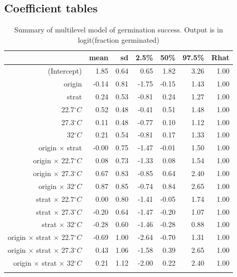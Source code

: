 \documentclass[12pt]{article}\usepackage[]{graphicx}\usepackage[]{color}
\begin{document}
\subsection{Coefficient tables}


\begin{longtable}{rrrrrrr}
\caption{Summary of multilevel model of germination success. Output is in logit(fraction germinated)} \\ 
  & mean & sd & 2.5\% & 50\% & 97.5\% & Rhat \\ 
  \hline
(Intercept) & 1.85 & 0.64 & 0.65 & 1.82 & 3.26 & 1.00 \\ 
  origin & -0.14 & 0.81 & -1.75 & -0.15 & 1.43 & 1.00 \\ 
  strat & 0.24 & 0.53 & -0.81 & 0.24 & 1.27 & 1.00 \\ 
  22.7$^\circ C$ & 0.52 & 0.48 & -0.41 & 0.51 & 1.48 & 1.00 \\ 
  27.3$^\circ C$ & 0.11 & 0.48 & -0.77 & 0.10 & 1.12 & 1.00 \\ 
  32$^\circ C$ & 0.21 & 0.54 & -0.81 & 0.17 & 1.33 & 1.00 \\ 
  origin $\times$ strat & -0.00 & 0.75 & -1.47 & -0.01 & 1.50 & 1.00 \\ 
  origin $\times$ 22.7$^\circ C$ & 0.08 & 0.73 & -1.33 & 0.08 & 1.54 & 1.00 \\ 
  origin $\times$ 27.3$^\circ C$ & 0.67 & 0.83 & -0.85 & 0.64 & 2.40 & 1.00 \\ 
  origin $\times$ 32$^\circ C$ & 0.87 & 0.85 & -0.74 & 0.84 & 2.65 & 1.00 \\ 
  strat $\times$ 22.7$^\circ C$ & 0.00 & 0.80 & -1.41 & -0.05 & 1.74 & 1.00 \\ 
  strat $\times$ 27.3$^\circ C$ & -0.20 & 0.64 & -1.47 & -0.20 & 1.07 & 1.00 \\ 
  strat $\times$ 32$^\circ C$ & -0.28 & 0.60 & -1.46 & -0.28 & 0.88 & 1.00 \\ 
  origin $\times$ strat $\times$ 22.7$^\circ C$ & -0.69 & 1.00 & -2.64 & -0.70 & 1.31 & 1.00 \\ 
  origin $\times$ strat $\times$ 27.3$^\circ C$ & 0.43 & 1.06 & -1.58 & 0.39 & 2.65 & 1.00 \\ 
  origin $\times$ strat $\times$ 32$^\circ C$ & 0.21 & 1.12 & -2.00 & 0.22 & 2.40 & 1.00 \\ 
  \hline
\label{tab:mod_rate}
\end{longtable}
\end{document}
